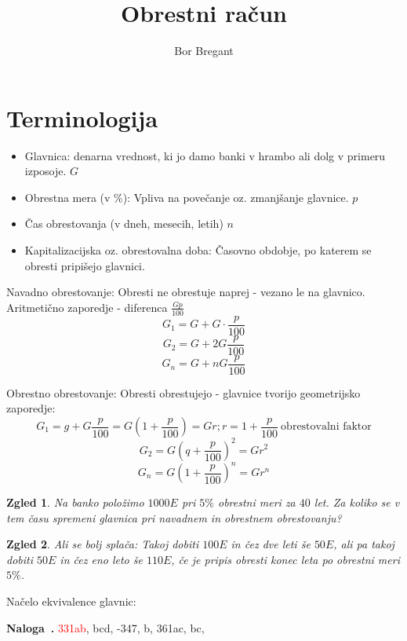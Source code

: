 \documentclass{article}
\title{Obrestni račun}
\author{Bor Bregant}
\date{\vspace{-5ex}}
\newcounter{example}[section]
\newenvironment{example}[1][]{\refstepcounter{example}\par\medskip
   \noindent \textbf{Naloga~\theexample. #1} \rmfamily}{\medskip}
\newtheorem*{zgled}{Zgled}
\begin{document}
\maketitle

\section{Terminologija}

\begin{itemize}
    \item Glavnica: denarna vrednost, ki jo damo banki v hrambo ali dolg v primeru izposoje. $G$
    \item Obrestna mera (v \%): Vpliva na povečanje oz. zmanjšanje glavnice. $p$
    \item Čas obrestovanja (v dneh, mesecih, letih) $n$
    \item Kapitalizacijska oz. obrestovalna doba: Časovno obdobje, po katerem se obresti pripišejo glavnici.
\end{itemize}

Navadno obrestovanje: Obresti ne obrestuje naprej - vezano le na glavnico.
Aritmetično zaporedje - diferenca $\frac{Gp}{100}$
\[G_1 = G+G\cdot\frac{p}{100}\]
\[G_2 = G+2G\frac{p}{100}\]
\[G_n=G+nG\frac{p}{100}\]

Obrestno obrestovanje: Obresti obrestujejo - glavnice tvorijo geometrijsko zaporedje:\\
\[G_1=g+G\frac{p}{100}=G(1+\frac{p}{100})=Gr; r=1+\frac{p}{100}\ \text{obrestovalni faktor}\]
\[G_2=G(q+\frac{p}{100})^2=Gr^2\]
\[G_n=G(1+\frac{p}{100})^n=Gr^n\]

\begin{zgled}
    Na banko položimo $1000E$ pri $5\%$ obrestni meri za $40$ let. Za koliko se v tem času spremeni glavnica pri navadnem in obrestnem obrestovanju?
\end{zgled}
\begin{zgled}
    Ali se bolj splača: Takoj dobiti $100E$ in čez dve leti še $50E$, ali pa takoj dobiti $50E$ in čez eno leto še $110E$, če je pripis obresti konec leta po obrestni meri $5\%$.
\end{zgled}

Načelo ekvivalence glavnic:

\begin{example}
    \textcolor{red}{331ab}, bcd, -347, b, 361ac, bc,
\end{example}
\end{document}

